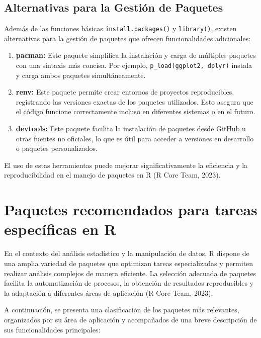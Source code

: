\documentclass[
  spanish,
  a4paper,
  DIV=11,
  numbers=noendperiod,
  onepage,
  openany]{scrreprt}
\begin{document}
\subsection{Alternativas para la Gestión de
Paquetes}\label{alternativas-para-la-gestiuxf3n-de-paquetes}

Además de las funciones básicas \texttt{install.packages()} y
\texttt{library()}, existen alternativas para la gestión de paquetes que
ofrecen funcionalidades adicionales:

\begin{enumerate}
\def\labelenumi{\arabic{enumi}.}
\item
  \textbf{pacman:} Este paquete simplifica la instalación y carga de
  múltiples paquetes con una sintaxis más concisa. Por ejemplo,
  \texttt{p\_load(ggplot2,\ dplyr)} instala y carga ambos paquetes
  simultáneamente.
\item
  \textbf{renv:} Este paquete permite crear entornos de proyectos
  reproducibles, registrando las versiones exactas de los paquetes
  utilizados. Esto asegura que el código funcione correctamente incluso
  en diferentes sistemas o en el futuro.
\item
  \textbf{devtools:} Este paquete facilita la instalación de paquetes
  desde GitHub u otras fuentes no oficiales, lo que es útil para acceder
  a versiones en desarrollo o paquetes personalizados.
\end{enumerate}

El uso de estas herramientas puede mejorar significativamente la
eficiencia y la reproducibilidad en el manejo de paquetes en R (R Core
Team, 2023).

\section{Paquetes recomendados para tareas específicas en
R}\label{paquetes-recomendados-para-tareas-especuxedficas-en-r}

En el contexto del análisis estadístico y la manipulación de datos, R
dispone de una amplia variedad de paquetes que optimizan tareas
especializadas y permiten realizar análisis complejos de manera
eficiente. La selección adecuada de paquetes facilita la automatización
de procesos, la obtención de resultados reproducibles y la adaptación a
diferentes áreas de aplicación (R Core Team, 2023).

A continuación, se presenta una clasificación de los paquetes más
relevantes, organizados por su área de aplicación y acompañados de una
breve descripción de sus funcionalidades principales:
\end{document}
